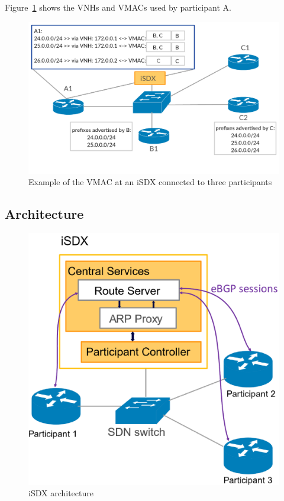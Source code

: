 Figure~\ref{fig:isdx_vmac} shows the VNHs and VMACs used by participant A.

\begin{figure}[h]
\center
\includegraphics[scale = 0.33]{Figures/sdx_vmac3.pdf}
\caption{Example of the VMAC at an iSDX connected to three participants}
\label{fig:isdx_vmac}
\end{figure}


\subsection{\label{chapter2:iSDX:iSDX_architecture}Architecture}
\begin{figure}[h]
\center
\includegraphics[scale = 0.3]{Figures/isdx_architectur_cropped.pdf}
\caption{iSDX architecture}
\end{figure}

